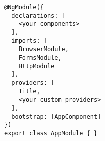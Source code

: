 \begin{verbatim}
@NgModule({
  declarations: [
    <your-components>
  ],
  imports: [
    BrowserModule,
    FormsModule,
    HttpModule
  ],
  providers: [
    Title,
    <your-custom-providers>
  ],
  bootstrap: [AppComponent]
})
export class AppModule { }
\end{verbatim}
